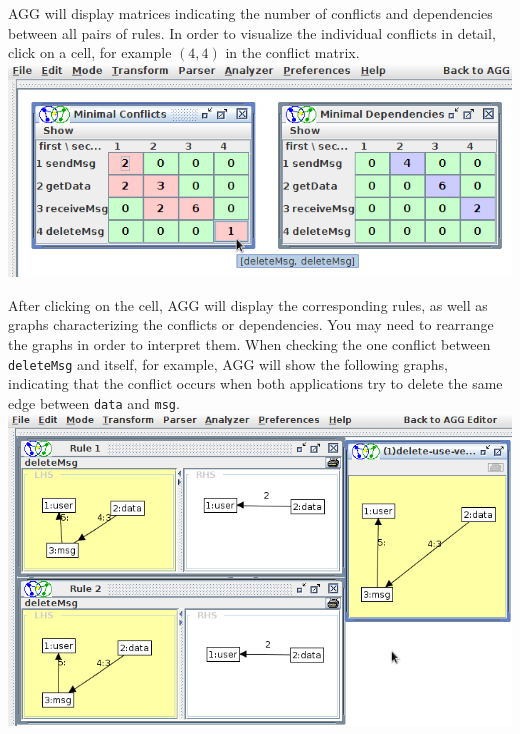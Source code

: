 \documentclass[12pt]{article}
\newenvironment{tutorialstep}
	{\hspace{-\parindent}\begin{minipage}{\textwidth}}
    {\vspace{.3cm}\end{minipage}}
\begin{document}
\begin{tutorialstep}
AGG will display matrices indicating the number of conflicts and dependencies between all pairs of rules. In order to visualize the individual conflicts in detail, click on a cell, for example $(4,4)$ in the conflict matrix. \\

\noindent
\centering
\includegraphics[scale = 0.5]{cpa_03.png}
\end{tutorialstep}

\begin{tutorialstep}
After clicking on the cell, AGG will display the corresponding rules, as well as graphs characterizing the conflicts or dependencies. You may need to rearrange the graphs in order to interpret them. When checking the one conflict between \texttt{deleteMsg} and itself, for example, AGG will show the following graphs, indicating that the conflict occurs when both applications try to delete the same edge between \texttt{data} and \texttt{msg}. \\

\noindent
\centering
\includegraphics[scale = 0.5]{cpa_04.png}
\end{tutorialstep}
\end{document}
